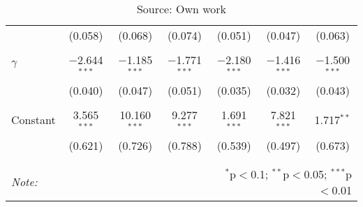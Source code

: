 \begin{table}[!htbp]
\begin{tabular}{@{\extracolsep{5pt}}lcccccc}
  & (0.058) & (0.068) & (0.074) & (0.051) & (0.047) & (0.063) \\ 
  & & & & & & \\ 
 $\gamma$ & $-$2.644$^{***}$ & $-$1.185$^{***}$ & $-$1.771$^{***}$ & $-$2.180$^{***}$ & $-$1.416$^{***}$ & $-$1.500$^{***}$ \\ 
  & (0.040) & (0.047) & (0.051) & (0.035) & (0.032) & (0.043) \\ 
  & & & & & & \\ 
 Constant & 3.565$^{***}$ & 10.160$^{***}$ & 9.277$^{***}$ & 1.691$^{***}$ & 7.821$^{***}$ & 1.717$^{**}$ \\ 
  & (0.621) & (0.726) & (0.788) & (0.539) & (0.497) & (0.673) \\ 
  & & & & & & \\ 
\hline 
\hline \\[-1.8ex] 
\textit{Note:}  & & & & \multicolumn{3}{r}{$^{*}$p$<$0.1; $^{**}$p$<$0.05; $^{***}$p$<$0.01} \\ 
\bottomrule 
\end{tabular}
\caption*{Source: Own work} 
\end{table} 


